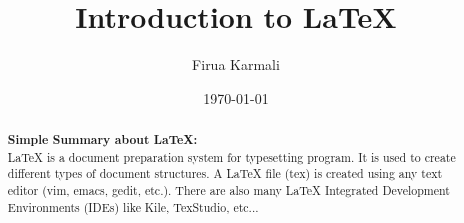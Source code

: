 \documentclass[a3paper,12pt]{article}
\title{Introduction to LaTeX}
\author{Firua Karmali}
\date{\today}
\begin{document}
\maketitle

\begin{abstract}
\textbf{Simple Summary about LaTeX:}\\
LaTeX is a document preparation system for typesetting program. It is used to create different types of document structures. A LaTeX file (tex) is created using any text editor (vim, emacs, gedit, etc.). There are also many LaTeX Integrated Development Environments (IDEs) like Kile, TexStudio, etc...
\end{abstract}
\end{document}
